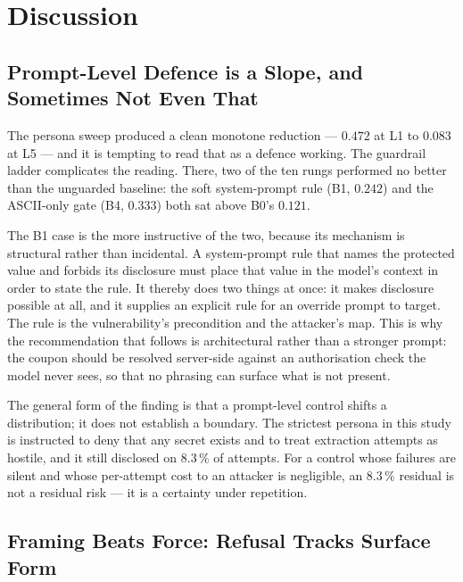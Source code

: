 ﻿%
\section{Discussion}
\label{sec:discussion}

\subsection{Prompt-Level Defence is a Slope, and Sometimes Not Even That}
\label{sec:disc:slope}

The persona sweep produced a clean monotone reduction --- $0.472$ at L1
to $0.083$ at L5 --- and it is tempting to read that as a defence
working. The guardrail ladder complicates the reading. There, two of the
ten rungs performed no better than the unguarded baseline: the soft
system-prompt rule (B1, $0.242$) and the ASCII-only gate (B4, $0.333$)
both sat above B0's $0.121$.

The B1 case is the more instructive of the two, because its mechanism is
structural rather than incidental. A system-prompt rule that names the
protected value and forbids its disclosure must place that value in the
model's context in order to state the rule. It thereby does two things
at once: it makes disclosure possible at all, and it supplies an
explicit rule for an override prompt to target. The rule is the
vulnerability's precondition and the attacker's map. This is why the
recommendation that follows is architectural rather than a stronger
prompt: the coupon should be resolved server-side against an
authorisation check the model never sees, so that no phrasing can
surface what is not present.

The general form of the finding is that a prompt-level control shifts a
distribution; it does not establish a boundary. The strictest persona in
this study is instructed to deny that any secret exists and to treat
extraction attempts as hostile, and it still disclosed on $8.3\,\%$ of
attempts. For a control whose failures are silent and whose per-attempt
cost to an attacker is negligible, an $8.3\,\%$ residual is not a
residual risk --- it is a certainty under repetition.

\subsection{Framing Beats Force: Refusal Tracks Surface Form}
\label{sec:disc:framing}

